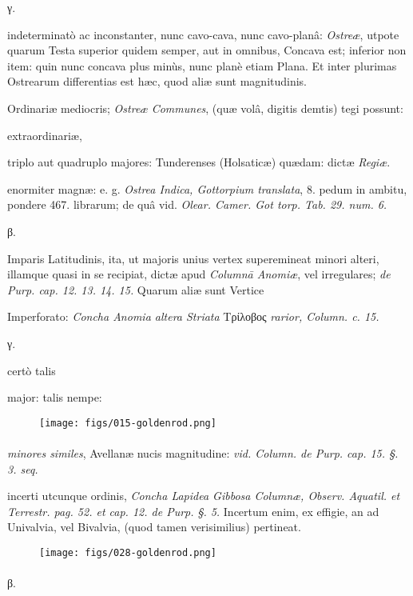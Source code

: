 \documentclass[a4paper, 11pt, oneside, polutonikogreek, german]{article}
\begin{document}
γ.

indeterminatò ac inconstanter, nunc cavo-cava, nunc cavo-planâ: \emph{Ostreæ}, utpote quarum Testa superior quidem semper, aut in omnibus, Concava est; inferior non item: quin nunc concava plus minùs, nunc planè etiam Plana. Et inter plurimas Ostrearum differentias est hæc, quod aliæ sunt magnitudinis.

Ordinariæ mediocris; \emph{Ostreæ Communes}, (quæ volâ, digitis demtis) tegi possunt:

extraordinariæ,

triplo aut quadruplo majores: Tunderenses (Holsaticæ) quædam: dictæ \emph{Regiæ}.

enormiter magnæ: e. g. \emph{Ostrea Indica, Gottorpium translata}, 8. pedum in ambitu, pondere 467. librarum; de quâ vid. \emph{Olear. Camer. Got torp. Tab. 29. num. 6.}

β.

Imparis Latitudinis, ita, ut majoris unius vertex superemineat minori alteri, illamque quasi in se recipiat, dictæ apud \emph{Columnā Anomiæ}, vel irregulares; \emph{de Purp. cap. 12. 13. 14. 15.} Quarum aliæ sunt Vertice

Imperforato: \emph{Concha Anomia altera Striata} Τρίλοβος \emph{rarior, Column. c. 15.}

γ.

certò talis

major: talis nempe:

\begin{figure}[H]
\centering
\texttt{[image: figs/015-goldenrod.png]}
\end{figure}
\paragraph{}
\emph{minores similes}, Avellanæ nucis magnitudine: \emph{vid. Column. de Purp. cap. 15. §. 3. seq.}

incerti utcunque ordinis, \emph{Concha Lapidea Gibbosa Columnæ, Observ. Aquatil. et Terrestr. pag. 52. et cap. 12. de Purp. §. 5.} Incertum enim, ex effigie, an ad Univalvia, vel Bivalvia, (quod tamen verisimilius) pertineat.

\begin{figure}[H]
\centering
\texttt{[image: figs/028-goldenrod.png]}
\end{figure}
\paragraph{}
β.
\end{document}
